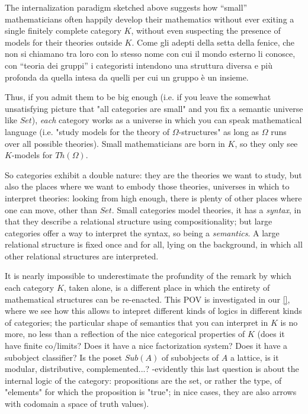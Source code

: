\documentclass{amsart}
\begin{document}
The internalization paradigm sketched above suggests how ``small'' mathematicians often happily develop their mathematics without ever exiting a single finitely complete category $K$, without even suspecting the presence of models for their theories outside $K$. Come gli adepti della setta della fenice, che non si chiamano tra loro con lo stesso nome con cui il mondo esterno li conosce, con ``teoria dei gruppi'' i categoristi intendono una struttura diversa e più profonda da quella intesa da quelli per cui un gruppo è un insieme.

Thus, if you admit them to be big enough (i.e. if you leave the somewhat unsatisfying picture that "all categories are small" and you fix a semantic universe like $Set$), \emph{each} category works as a universe in which you can speak mathematical language (i.e. "study models for the theory of $\Omega$-structures" as long as $\Omega$ runs over all possible theories). Small mathematicians are born in $K$, so they only see $K$-models for $Th(\Omega)$.

So categories exhibit a double nature: they are the theories we want to study, but also the places where we want to embody those theories, universes in which to interpret theories: looking from high enough, there is plenty of other places where one can move, other than $Set$. Small categories model theories, it has a \emph{syntax}, in that they describe a relational structure using compositionality; but large categories offer a way to interpret the syntax, so being a \emph{semantics}. A large relational structure is fixed once and for all, lying on the background, in which all other relational structures are interpreted.

It is nearly impossible to underestimate the profundity of the remark by which each category $K$, taken alone, is a different place in which the entirety of mathematical structures can be re-enacted. This POV is investigated in our \ref{}, where we see how this allows to intepret different kinds of logics in different kinds of categories; the particular shape of semantics that you can interpret in $K$ is no more, no less than a reflection of the nice categorical properties of $K$ (does it have finite co/limits? Does it have a nice factorization system? Does it have a subobject classifier? Is the poset $Sub(A)$ of subobjects of $A$ a lattice, is it modular, distributive, complemented...? -evidently this last question is about the internal logic of the category: propositions are the set, or rather the type, of "elements" for which the proposition is "true"; in nice cases, they are also arrows with codomain a space of truth values).
\end{document}
